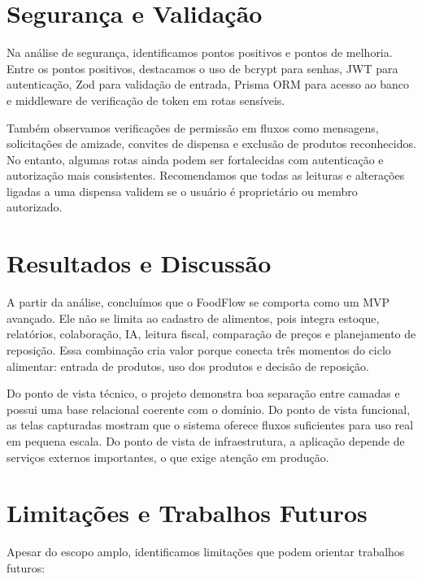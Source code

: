 \documentclass[12pt]{article}
\begin{document}
\section{Segurança e Validação}

Na análise de segurança, identificamos pontos positivos e pontos de melhoria. Entre os pontos positivos, destacamos o uso de bcrypt para senhas, JWT para autenticação, Zod para validação de entrada, Prisma ORM para acesso ao banco e middleware de verificação de token em rotas sensíveis.

Também observamos verificações de permissão em fluxos como mensagens, solicitações de amizade, convites de dispensa e exclusão de produtos reconhecidos. No entanto, algumas rotas ainda podem ser fortalecidas com autenticação e autorização mais consistentes. Recomendamos que todas as leituras e alterações ligadas a uma dispensa validem se o usuário é proprietário ou membro autorizado.

\section{Resultados e Discussão}

A partir da análise, concluímos que o FoodFlow se comporta como um MVP avançado. Ele não se limita ao cadastro de alimentos, pois integra estoque, relatórios, colaboração, IA, leitura fiscal, comparação de preços e planejamento de reposição. Essa combinação cria valor porque conecta três momentos do ciclo alimentar: entrada de produtos, uso dos produtos e decisão de reposição.

Do ponto de vista técnico, o projeto demonstra boa separação entre camadas e possui uma base relacional coerente com o domínio. Do ponto de vista funcional, as telas capturadas mostram que o sistema oferece fluxos suficientes para uso real em pequena escala. Do ponto de vista de infraestrutura, a aplicação depende de serviços externos importantes, o que exige atenção em produção.

\section{Limitações e Trabalhos Futuros}

Apesar do escopo amplo, identificamos limitações que podem orientar trabalhos futuros:
\end{document}
